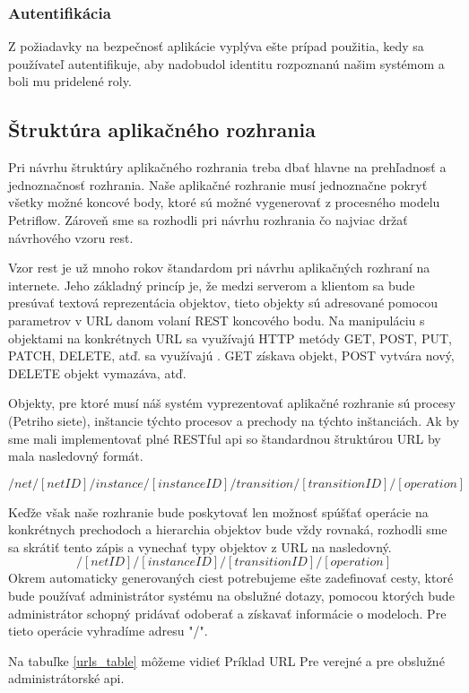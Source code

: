 \subsubsection{Autentifikácia}
Z požiadavky na bezpečnosť aplikácie vyplýva ešte prípad použitia, kedy sa používateľ autentifikuje, aby nadobudol identitu rozpoznanú našim systémom a boli mu pridelené roly.

\subsection{Štruktúra aplikačného rozhrania}
Pri návrhu štruktúry aplikačného rozhrania treba dbať hlavne na prehľadnosť a jednoznačnosť rozhrania. Naše aplikačné rozhranie musí jednoznačne pokryť všetky možné koncové body, ktoré sú možné vygenerovať z procesného modelu Petriflow. Zároveň sme sa rozhodli pri návrhu rozhrania čo najviac držať návrhového vzoru \acrshort{rest}. 

Vzor \acrshort{rest} je už mnoho rokov štandardom pri návrhu aplikačných rozhraní na internete. Jeho základný princíp je, že medzi serverom a klientom sa bude presúvať textová reprezentácia objektov, tieto objekty sú adresované pomocou parametrov v URL danom volaní REST koncového bodu. Na manipuláciu s objektami na konkrétnych URL sa využívajú HTTP metódy GET, POST, PUT, PATCH, DELETE, atď.  sa využívajú . GET získava objekt, POST vytvára nový, DELETE objekt vymazáva, atď.

Objekty, pre ktoré musí náš systém vyprezentovať aplikačné rozhranie sú  procesy (Petriho siete), inštancie týchto procesov a prechody na týchto inštanciách. Ak by sme mali implementovať plné RESTful \acrshort{api} so štandardnou štruktúrou URL by mala nasledovný formát.

\[/net/[netID]/instance/[instanceID]/transition/[transitionID]/[operation] \]

Keďže však naše rozhranie bude poskytovať len možnosť spúšťať operácie na konkrétnych prechodoch a hierarchia objektov bude vždy rovnaká, rozhodli sme sa skrátiť tento zápis a vynechať typy objektov z URL na nasledovný.
\[/[netID]/[instanceID]/[transitionID]/[operation] \]
Okrem automaticky generovaných ciest potrebujeme ešte zadefinovať cesty, ktoré bude používať administrátor systému na obslužné dotazy, pomocou ktorých bude administrátor schopný pridávať odoberať a získavať informácie o modeloch. Pre tieto operácie vyhradíme adresu "/".

Na tabuľke \ref{urls_table} môžeme vidieť  Príklad URL Pre verejné a pre obslužné administrátorské \acrshort{api}.

